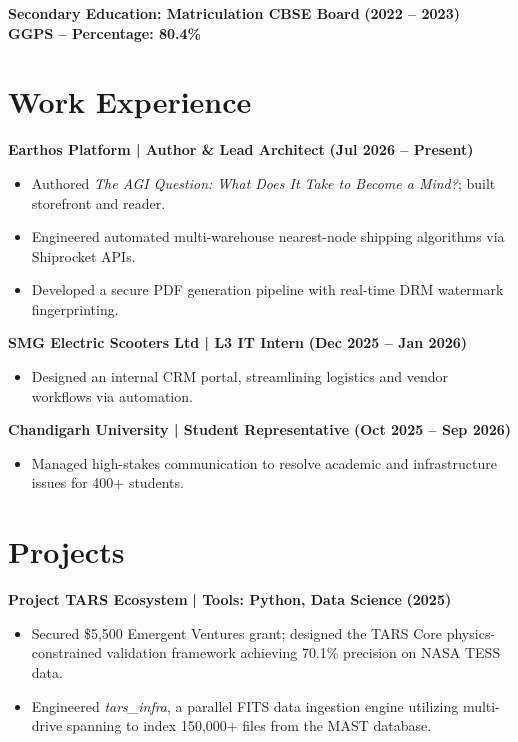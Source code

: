 \documentclass[9pt,a4paper]{extarticle}
\begin{document}
\textbf{Secondary Education: Matriculation CBSE Board} \hfill \textbf{(2022 -- 2023)} \\
{\color{primary}\textbf{GGPS -- Percentage: 80.4\%}}

\section{Work Experience}
\textbf{Earthos Platform | Author \& Lead Architect} \hfill \textbf{(Jul 2026 -- Present)}
\begin{itemize}
    \item Authored \textit{The AGI Question: What Does It Take to Become a Mind?}; built storefront and reader.
    \item Engineered automated multi-warehouse nearest-node shipping algorithms via Shiprocket APIs.
    \item Developed a secure PDF generation pipeline with real-time DRM watermark fingerprinting.
\end{itemize}
\vspace{0.2mm}

\textbf{SMG Electric Scooters Ltd | L3 IT Intern} \hfill \textbf{(Dec 2025 -- Jan 2026)}
\begin{itemize}
    \item Designed an internal CRM portal, streamlining logistics and vendor workflows via automation.
\end{itemize}
\vspace{0.2mm}

\textbf{Chandigarh University | Student Representative} \hfill \textbf{(Oct 2025 -- Sep 2026)}
\begin{itemize}
    \item Managed high-stakes communication to resolve academic and infrastructure issues for 400+ students.
\end{itemize}

\section{Projects}
\textbf{Project TARS Ecosystem} {\color{primary}\textbf{| Tools: Python, Data Science}} \hfill \textbf{(2025)}
\begin{itemize}
    \item Secured \$5,500 Emergent Ventures grant; designed the TARS Core physics-constrained validation framework achieving 70.1\% precision on NASA TESS data.
    \item Engineered \textit{tars\_infra}, a parallel FITS data ingestion engine utilizing multi-drive spanning to index 150,000+ files from the MAST database.
\end{itemize}
\vspace{0.2mm}
\end{document}
